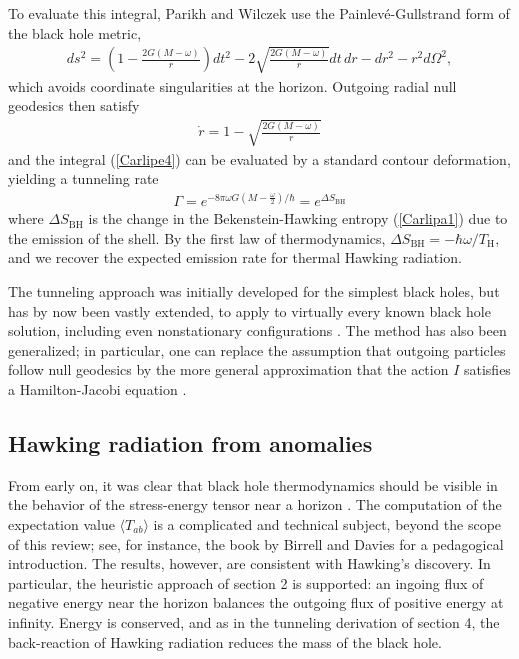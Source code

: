 \documentclass[12pt]{article}
\begin{document}
To evaluate this integral, Parikh and Wilczek use the Painlev{\'e}-Gullstrand
form of the black hole metric,
\begin{align}
ds^2 = \left(1-\frac{2G(M-\omega)}{r}\right)dt^2 
  - 2\sqrt{\frac{2G(M-\omega)}{r}}dt\,dr - dr^2 - r^2d\Omega^2  ,
\label{Carlipe2}
\end{align}
which avoids coordinate singularities at the horizon.  Outgoing radial 
null geodesics then satisfy
\begin{align*}
{\dot r} = 1 - \sqrt{\frac{2G(M-\omega)}{r}} 
\end{align*}
and the integral  (\ref{Carlipe4}) can be evaluated by a standard contour
deformation, yielding a tunneling rate
\begin{align}
\Gamma = e^{-8\pi\omega G\left(M - \frac{\omega}{2}\right)/\hbar} 
 = e^{\Delta S_{\scriptscriptstyle\mathrm{BH}}}
\label{Carlipe5}
\end{align}
where $\Delta S_{\scriptscriptstyle\mathrm{BH}}$ is the change in the 
Bekenstein-Hawking entropy (\ref{Carlipa1}) due to the emission of the shell.  
By the first law of thermodynamics, $\Delta S_{\scriptscriptstyle\mathrm{BH}} 
= -\hbar\omega/T_{\scriptscriptstyle\mathrm{H}}$, and we recover the 
expected emission rate for thermal Hawking radiation.  

The tunneling approach was initially developed for the simplest black holes,  
but has by now been vastly extended, to apply to virtually every known
black hole solution, including even nonstationary configurations 
\cite{Vanzoreview}.  The method has also been generalized; in particular,
one can replace the assumption that outgoing particles follow null 
geodesics by the more general approximation that the action $I$ satisfies 
a Hamilton-Jacobi equation \cite{HJ}.   

\subsection{Hawking radiation from anomalies \label{anoma}}

From early on, it was clear that black hole thermodynamics should be
visible in the behavior of the stress-energy tensor near a   
horizon \cite{DeWitt,Daviesx}.  The computation of the expectation
value $\langle T_{ab}\rangle$ is a complicated and technical subject, 
beyond the scope of this review; see, for instance, the book by Birrell and 
Davies \cite{BirrellDavies} for a pedagogical introduction.  The results, however, 
are consistent with Hawking's discovery.  In particular, the heuristic approach
of section 2 is supported:  an ingoing flux of negative energy 
near the horizon balances the outgoing flux of positive energy at infinity.  
Energy is conserved, and as in the tunneling derivation of section 4, 
the back-reaction of Hawking radiation reduces the mass of the black hole.
\end{document}
